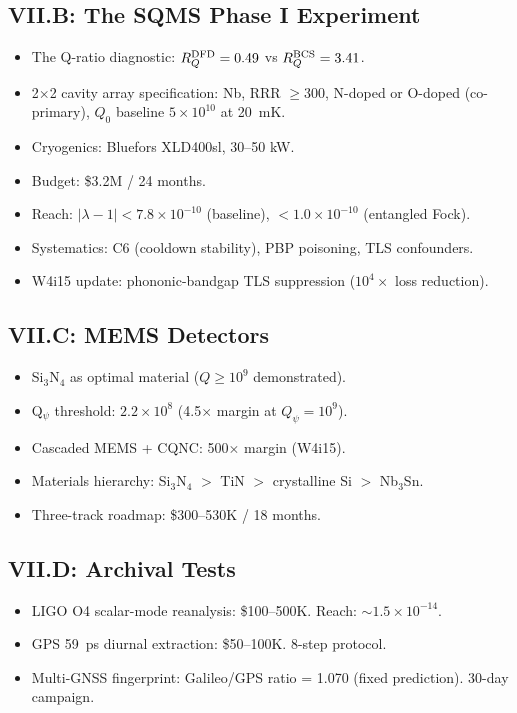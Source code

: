 \documentclass[11pt,a4paper]{article}
\begin{document}
\subsection{VII.B: The SQMS Phase I Experiment}

\begin{itemize}
\item The Q-ratio diagnostic: $R_Q^{\rm DFD} = 0.49$ vs $R_Q^{\rm BCS} = 3.41$.
\item 2$\times$2 cavity array specification: Nb, RRR $\geq 300$, N-doped or O-doped (co-primary), $Q_0$ baseline $5 \times 10^{10}$ at 20~mK.
\item Cryogenics: Bluefors XLD400sl, 30--50 kW.
\item Budget: \$3.2M / 24 months.
\item Reach: $|\lambda - 1| < 7.8 \times 10^{-10}$ (baseline), $< 1.0 \times 10^{-10}$ (entangled Fock).
\item Systematics: C6 (cooldown stability), PBP poisoning, TLS confounders.
\item W4i15 update: phononic-bandgap TLS suppression ($10^4\times$ loss reduction).
\end{itemize}

\subsection{VII.C: MEMS Detectors}

\begin{itemize}
\item Si$_3$N$_4$ as optimal material ($Q \geq 10^9$ demonstrated).
\item Q$_\psi$ threshold: $2.2 \times 10^8$ (4.5$\times$ margin at $Q_\psi = 10^9$).
\item Cascaded MEMS + CQNC: 500$\times$ margin (W4i15).
\item Materials hierarchy: Si$_3$N$_4$ $>$ TiN $>$ crystalline Si $>$ Nb$_3$Sn.
\item Three-track roadmap: \$300--530K / 18 months.
\end{itemize}

\subsection{VII.D: Archival Tests}

\begin{itemize}
\item LIGO O4 scalar-mode reanalysis: \$100--500K. Reach: $\sim 1.5 \times 10^{-14}$.
\item GPS 59~ps diurnal extraction: \$50--100K. 8-step protocol.
\item Multi-GNSS fingerprint: Galileo/GPS ratio = 1.070 (fixed prediction). 30-day campaign.
\end{itemize}
\end{document}
